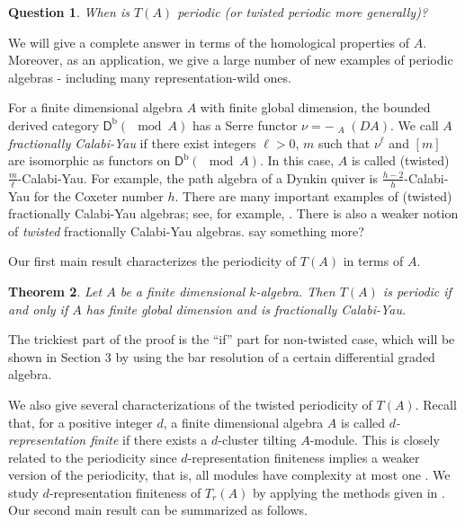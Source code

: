 \documentclass[a4paper,reqno,11pt]{amsart}
\newtheorem{theorem}{Theorem}[section]
\newtheorem{question}[theorem]{Question}
\theoremstyle{definition}
\newcommand{\DDD}{\mathsf{D}}
\newcommand{\bo}{\operatorname{b}\nolimits}
\newcommand{\Lotimes}{\mathop{\stackrel{\mathbf{L}}{\otimes}}\nolimits}
\newcommand{\new}[1]{{\blue #1}}
\newcommand{\old}[1]{{\red #1}}
\renewcommand{\comment}[1]{{\color{green!50!gray} #1}}
\numberwithin{equation}{section}
\begin{document}
\begin{question}
When is $T(A)$ periodic (or twisted periodic more generally)?
\end{question}

We will give a complete answer in terms of the homological properties of $A$.  Moreover, as an application, we give a large number of new examples of periodic algebras \new{- including many representation-wild ones}.

For a finite dimensional algebra $A$ with finite global dimension, the bounded derived category $\DDD^{\bo}(\mod A)$ has a Serre functor $\nu=-\Lotimes_A(DA)$. We call $A$ \emph{fractionally Calabi-Yau} if there exist integers $\ell>0$, $m$ such that $\nu^\ell$ and $[m]$ are isomorphic as functors on $\DDD^{\bo}(\mod A)$.  In this case, $A$ is called \old{(twisted)} $\frac{m}{\ell}$-Calabi-Yau.  For example, the path algebra of a Dynkin quiver is $\frac{h-2}{h}$-Calabi-Yau for the Coxeter number $h$.
There are many important examples of (twisted) fractionally Calabi-Yau algebras\new{; see, for example,} \cite{HerIya}.
There is also a weaker notion of \emph{twisted} fractionally Calabi-Yau algebras.  \comment{say something more?}

Our first main result characterizes the periodicity of $T(A)$ in terms of $A$.

\begin{theorem}\label{main theorem}
Let $A$ be a finite dimensional $k$-algebra.
Then $T(A)$ is periodic if and only if $A$ has finite global dimension and is fractionally Calabi-Yau.
\end{theorem}

The trickiest part of the proof is the ``if'' part \old{for non-twisted case}, which will be shown in Section 3 by using the bar resolution of a certain differential graded algebra.

We also give several characterizations of the twisted periodicity of $T(A)$.
Recall that, for a positive integer $d$, a finite dimensional algebra $A$ is called \emph{$d$-representation finite} if there exists a $d$-cluster tilting $A$-module. This is closely related to the periodicity since $d$-representation finiteness implies a weaker version of the periodicity, that is, all modules have complexity at most one \cite{EH}. We study $d$-representation finiteness of $T_r(A)$ by applying the methods given in \cite[Section 2.2]{DI}.
Our second main result can be summarized as follows.
\end{document}
